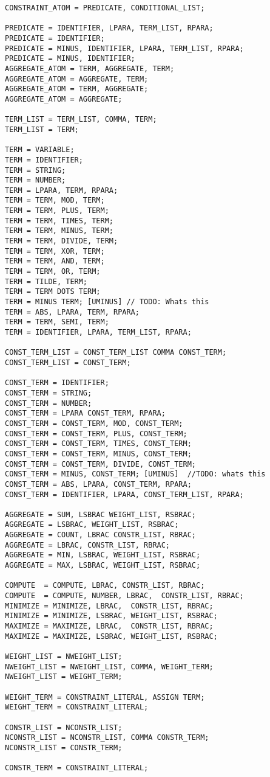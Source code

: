 \begin{verbatim}
CONSTRAINT_ATOM = PREDICATE, CONDITIONAL_LIST;

PREDICATE = IDENTIFIER, LPARA, TERM_LIST, RPARA;
PREDICATE = IDENTIFIER;
PREDICATE = MINUS, IDENTIFIER, LPARA, TERM_LIST, RPARA;
PREDICATE = MINUS, IDENTIFIER;
AGGREGATE_ATOM = TERM, AGGREGATE, TERM;
AGGREGATE_ATOM = AGGREGATE, TERM;
AGGREGATE_ATOM = TERM, AGGREGATE;
AGGREGATE_ATOM = AGGREGATE;

TERM_LIST = TERM_LIST, COMMA, TERM;
TERM_LIST = TERM;

TERM = VARIABLE;
TERM = IDENTIFIER;
TERM = STRING;
TERM = NUMBER;
TERM = LPARA, TERM, RPARA;
TERM = TERM, MOD, TERM;
TERM = TERM, PLUS, TERM;
TERM = TERM, TIMES, TERM;
TERM = TERM, MINUS, TERM;
TERM = TERM, DIVIDE, TERM;
TERM = TERM, XOR, TERM;
TERM = TERM, AND, TERM;
TERM = TERM, OR, TERM;
TERM = TILDE, TERM;
TERM = TERM DOTS TERM;
TERM = MINUS TERM; [UMINUS] // TODO: Whats this
TERM = ABS, LPARA, TERM, RPARA;
TERM = TERM, SEMI, TERM;
TERM = IDENTIFIER, LPARA, TERM_LIST, RPARA;

CONST_TERM_LIST = CONST_TERM_LIST COMMA CONST_TERM;
CONST_TERM_LIST = CONST_TERM;

CONST_TERM = IDENTIFIER;
CONST_TERM = STRING;
CONST_TERM = NUMBER;
CONST_TERM = LPARA CONST_TERM, RPARA;
CONST_TERM = CONST_TERM, MOD, CONST_TERM;
CONST_TERM = CONST_TERM, PLUS, CONST_TERM;
CONST_TERM = CONST_TERM, TIMES, CONST_TERM;
CONST_TERM = CONST_TERM, MINUS, CONST_TERM;
CONST_TERM = CONST_TERM, DIVIDE, CONST_TERM;
CONST_TERM = MINUS, CONST_TERM; [UMINUS]  //TODO: whats this
CONST_TERM = ABS, LPARA, CONST_TERM, RPARA;
CONST_TERM = IDENTIFIER, LPARA, CONST_TERM_LIST, RPARA;

AGGREGATE = SUM, LSBRAC WEIGHT_LIST, RSBRAC;
AGGREGATE = LSBRAC, WEIGHT_LIST, RSBRAC;
AGGREGATE = COUNT, LBRAC CONSTR_LIST, RBRAC;
AGGREGATE = LBRAC, CONSTR_LIST, RBRAC;
AGGREGATE = MIN, LSBRAC, WEIGHT_LIST, RSBRAC;
AGGREGATE = MAX, LSBRAC, WEIGHT_LIST, RSBRAC;

COMPUTE  = COMPUTE, LBRAC, CONSTR_LIST, RBRAC;
COMPUTE  = COMPUTE, NUMBER, LBRAC,  CONSTR_LIST, RBRAC;
MINIMIZE = MINIMIZE, LBRAC,  CONSTR_LIST, RBRAC;
MINIMIZE = MINIMIZE, LSBRAC, WEIGHT_LIST, RSBRAC;
MAXIMIZE = MAXIMIZE, LBRAC,  CONSTR_LIST, RBRAC;
MAXIMIZE = MAXIMIZE, LSBRAC, WEIGHT_LIST, RSBRAC;

WEIGHT_LIST = NWEIGHT_LIST;
NWEIGHT_LIST = NWEIGHT_LIST, COMMA, WEIGHT_TERM;
NWEIGHT_LIST = WEIGHT_TERM;

WEIGHT_TERM = CONSTRAINT_LITERAL, ASSIGN TERM;
WEIGHT_TERM = CONSTRAINT_LITERAL;

CONSTR_LIST = NCONSTR_LIST;
NCONSTR_LIST = NCONSTR_LIST, COMMA CONSTR_TERM;
NCONSTR_LIST = CONSTR_TERM;

CONSTR_TERM = CONSTRAINT_LITERAL;
\end{verbatim}